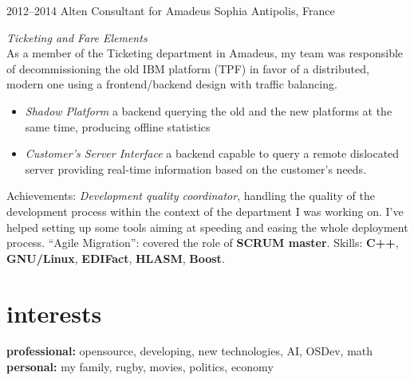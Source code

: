 \documentclass[]{friggeri-cv}
\begin{document}
\begin{entrylist}
  \entry
      {2012--2014}
      {Alten Consultant for Amadeus}
      {Sophia Antipolis, France}
      {\emph{Ticketing and Fare Elements} \\
        As a member of the Ticketing department in Amadeus, my team was
        responsible of decommissioning the old IBM platform (TPF) in favor of a
        distributed, modern one using a frontend/backend design with traffic
        balancing.
        \begin{itemize}
        \item \emph{Shadow Platform} a backend querying the old and the new
          platforms at the same time, producing offline statistics
        \item \emph{Customer's Server Interface} a backend capable to query a
          remote dislocated server providing real-time information based on the
          customer's needs.
        \end{itemize}
        Achievements: \emph{Development quality coordinator}, handling the
        quality of the development process within the context of the department
        I was working on. I've helped setting up some tools aiming at speeding
        and easing the whole deployment process. ``Agile Migration'': covered
        the role of \textbf{SCRUM master}. Skills: \textbf{C++},
        \textbf{GNU/Linux}, \textbf{EDIFact}, \textbf{HLASM}, \textbf{Boost}.
      }
\end{entrylist}




\section{interests}

\textbf{professional:} opensource, developing, new technologies, AI, OSDev, math \\
\textbf{personal:} my family, rugby, movies, politics, economy
\end{document}
